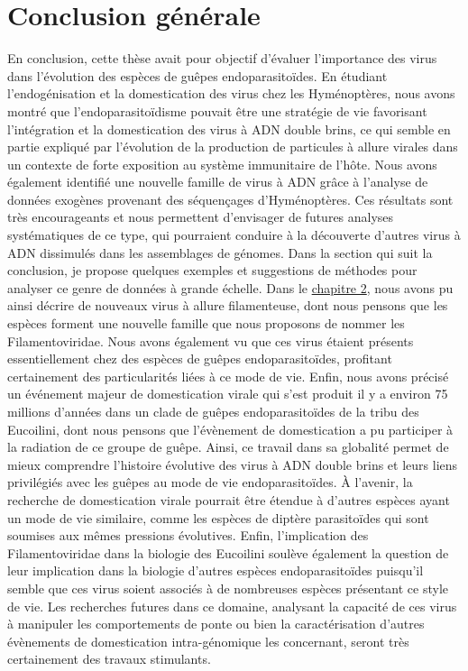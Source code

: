 \section{Conclusion générale}

En conclusion, cette thèse avait pour objectif d'évaluer l'importance des virus dans l'évolution des espèces de guêpes endoparasitoïdes. En étudiant l'endogénisation et la domestication des virus chez les Hyménoptères, nous avons montré que l'endoparasitoïdisme pouvait être une stratégie de vie favorisant l'intégration et la domestication des virus à ADN double brins, ce qui semble en partie expliqué par l'évolution de la production de particules à allure virales dans un contexte de forte exposition au système immunitaire de l'hôte. Nous avons également identifié une nouvelle famille de virus à ADN grâce à l'analyse de données exogènes provenant des séquençages d'Hyménoptères. Ces résultats sont très encourageants et nous permettent d'envisager de futures analyses systématiques de ce type, qui pourraient conduire à la découverte d'autres virus à ADN dissimulés dans les assemblages de génomes. Dans la section qui suit la conclusion, je propose quelques exemples et suggestions de méthodes pour analyser ce genre de données à grande échelle. Dans le \hyperref[sec:chap2]{chapitre 2}, nous avons pu ainsi décrire de nouveaux virus à allure filamenteuse, dont nous pensons que les espèces forment une nouvelle famille que nous proposons de nommer les Filamentoviridae. Nous avons également vu que ces virus étaient présents essentiellement chez des espèces de guêpes endoparasitoïdes, profitant certainement des particularités  liées à ce mode de vie. Enfin, nous avons précisé un événement majeur de domestication virale qui s'est produit il y a environ 75 millions d'années dans un clade de guêpes endoparasitoïdes de la tribu des Eucoilini, dont nous pensons que l'évènement de domestication a pu participer à la radiation de ce groupe de guêpe. Ainsi, ce travail dans sa globalité permet de mieux comprendre l'histoire évolutive des virus à ADN double brins et leurs liens privilégiés avec les guêpes au mode de vie endoparasitoïdes. À l'avenir, la recherche de domestication virale pourrait être étendue à d'autres espèces ayant un mode de vie similaire, comme les espèces de diptère parasitoïdes qui sont soumises aux mêmes pressions évolutives. Enfin, l'implication des Filamentoviridae dans la biologie des Eucoilini soulève également la question de leur implication dans la biologie d'autres espèces endoparasitoïdes puisqu'il semble que ces virus soient associés à de nombreuses espèces présentant ce style de vie. Les recherches futures dans ce domaine, analysant la capacité de ces virus à manipuler les comportements de ponte ou bien la caractérisation d'autres évènements de domestication intra-génomique les concernant, seront très certainement des travaux stimulants. 


